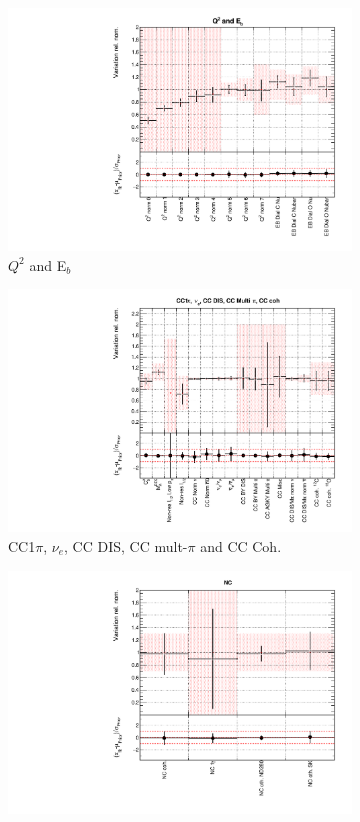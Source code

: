 \begin{figure}
\begin{subfigure}{0.49\textwidth}
  \includegraphics[width=0.95\linewidth]{figs/asmvxsec2}
  \caption{$Q^2$ and E$_b$}
  \label{fig:}
\end{subfigure}
\begin{subfigure}{0.49\textwidth}
  \centering
  \includegraphics[width=0.95\linewidth]{figs/asmvxsec3}
  \caption{CC1$\pi$, $\nu_e$, CC DIS, CC mult-$\pi$ and CC Coh.}
  \label{fig:}
\end{subfigure}
\begin{subfigure}{0.49\textwidth}
  \centering
  \includegraphics[width=0.95\linewidth]{figs/asmvxsec4}

\end{subfigure}
\end{figure}
